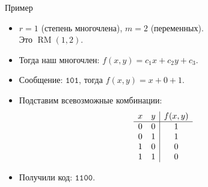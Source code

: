 \documentclass[articleoptions={12pt,a4paper,oneside}]{beamerswitch}
\DeclareMathOperator{\RM}{RM}
\begin{document}
\begin{frame}{Пример}
    \begin{itemize}
        \item $r = 1$ (степень многочлена), $m = 2$ (переменных).\\Это $\RM(1, 2)$. \\
        \item Тогда наш многочлен: $f(x, y) = c_1 x + c_2 y + c_3$.
        \item Сообщение: $\mathtt{101}$, тогда $f(x, y) = x + 0 + 1$.
        \item Подставим всевозможные комбинации:
            \[
                \begin{array}{cc | c}
                    x & y & f(x, y) \\\hline
                    0 & 0 & 1 \\
                    0 & 1 & 1 \\
                    1 & 0 & 0 \\
                    1 & 1 & 0
                \end{array}
            \]
        \item Получили код: $\mathtt{1100}$.
    \end{itemize}
\end{frame}
\end{document}
